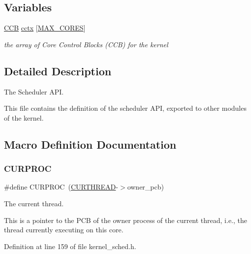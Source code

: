 \subsection*{Variables}
\begin{DoxyCompactItemize}
\item 
\mbox{\label{group__scheduler_ga3be3b151b275926dff3fb99bee765eab}} 
\hyperlink{group__scheduler_ga7485b31e0dd9fd723bc2d75fba5206a0}{C\+CB} \hyperlink{group__scheduler_ga3be3b151b275926dff3fb99bee765eab}{cctx} \mbox{[}\hyperlink{bios_8h_a009855593b59738d24dbfc236edb3b14}{M\+A\+X\+\_\+\+C\+O\+R\+ES}\mbox{]}
\begin{DoxyCompactList}\small\item\em the array of Core Control Blocks (C\+CB) for the kernel \end{DoxyCompactList}\end{DoxyCompactItemize}


\subsection{Detailed Description}
The Scheduler A\+PI. 

This file contains the definition of the scheduler A\+PI, exported to other modules of the kernel. 

\subsection{Macro Definition Documentation}
\mbox{\label{group__scheduler_gae3437e8e6787ef05b6576d03c5b6a0ca}} 
\subsubsection{\texorpdfstring{C\+U\+R\+P\+R\+OC}{CURPROC}}
{\footnotesize\ttfamily \#define C\+U\+R\+P\+R\+OC~(\hyperlink{group__scheduler_ga587a82c8931f0df72f43cc913ceb7e27}{C\+U\+R\+T\+H\+R\+E\+AD}-\/$>$owner\+\_\+pcb)}



The current thread. 

This is a pointer to the P\+CB of the owner process of the current thread, i.\+e., the thread currently executing on this core. 

Definition at line 159 of file kernel\+\_\+sched.\+h.

